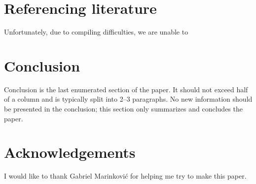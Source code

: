 \documentclass[10pt, a4paper]{article}
\begin{document}
\section{Referencing literature}

Unfortunately, due to compiling difficulties, we are unable to 

\section{Conclusion}

Conclusion is the last enumerated section of the paper. It should not exceed half of a column and is typically split into 2--3 paragraphs. No new information should be presented in the conclusion; this section only summarizes and concludes the paper.

\section*{Acknowledgements}

I would like to thank Gabriel Marinković for helping me try to make this paper.


 
\end{document}
